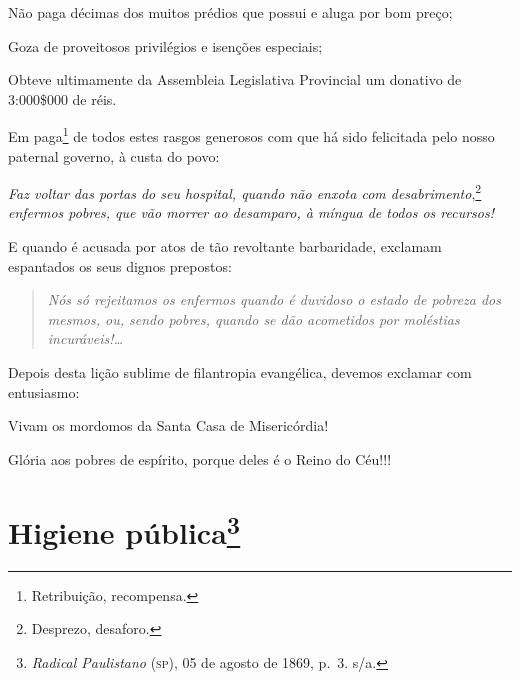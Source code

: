 Não paga décimas dos muitos prédios que possui e aluga por bom preço;

Goza de proveitosos privilégios e isenções especiais;

Obteve ultimamente da Assembleia Legislativa Provincial um donativo de
3:000\$000 de réis.

Em paga\footnote{Retribuição, recompensa.} de todos estes rasgos
generosos com que há sido felicitada pelo nosso paternal governo, à
custa do povo:

\emph{Faz voltar das portas do seu hospital, quando não enxota com
desabrimento},\footnote{Desprezo, desaforo.} \emph{enfermos
pobres, que vão morrer ao desamparo, à míngua de todos os recursos!}

E quando é acusada por atos de tão revoltante barbaridade, exclamam
espantados os seus dignos prepostos:

\begin{quote}
\emph{Nós só rejeitamos os enfermos quando é duvidoso o estado de
pobreza dos mesmos, ou, sendo pobres, quando se dão acometidos por
moléstias incuráveis!\ldots{}}
\end{quote}

Depois desta lição sublime de filantropia evangélica, devemos exclamar
com entusiasmo:

Vivam os mordomos da Santa Casa de Misericórdia!

Glória aos pobres de espírito, porque deles é o Reino do Céu!!!

\chapter{Higiene pública\footnote{\emph{Radical Paulistano} (\textsc{sp}),
  05 de agosto de 1869, p.~3. s/a.}}

